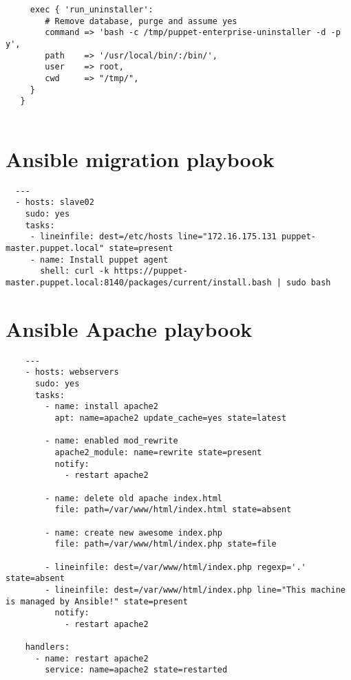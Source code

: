 \begin{appendices}
\begin{lstlisting}
     exec { 'run_uninstaller':
        # Remove database, purge and assume yes
        command => 'bash -c /tmp/puppet-enterprise-uninstaller -d -p y',
        path    => '/usr/local/bin/:/bin/',
        user	=> root,
        cwd     => "/tmp/",
     }
   }
 
  \end{lstlisting}
  
  \newpage  
  \section{Ansible migration playbook} \label{app:ansiblemigration}
  \begin{lstlisting}
  ---
  - hosts: slave02
    sudo: yes
    tasks:
     - lineinfile: dest=/etc/hosts line="172.16.175.131 puppet-master.puppet.local" state=present
     - name: Install puppet agent
       shell: curl -k https://puppet-master.puppet.local:8140/packages/current/install.bash | sudo bash
  \end{lstlisting}

  \newpage
  \section{Ansible Apache playbook} \label{app:ansibleplaybook}
  \begin{lstlisting}
    ---
    - hosts: webservers
      sudo: yes
      tasks:
        - name: install apache2
          apt: name=apache2 update_cache=yes state=latest

        - name: enabled mod_rewrite
          apache2_module: name=rewrite state=present
          notify:
            - restart apache2

        - name: delete old apache index.html
          file: path=/var/www/html/index.html state=absent

        - name: create new awesome index.php
          file: path=/var/www/html/index.php state=file

        - lineinfile: dest=/var/www/html/index.php regexp='.' state=absent
        - lineinfile: dest=/var/www/html/index.php line="This machine is managed by Ansible!" state=present
          notify:
            - restart apache2

    handlers:
      - name: restart apache2
        service: name=apache2 state=restarted
  \end{lstlisting}

\end{appendices}


